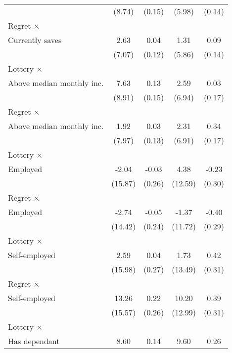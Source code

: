 \begin{table}[htbp]
\begin{tabular}{l*{4}{c}}
                &   (8.74)         &   (0.15)         &   (5.98)         &   (0.14)         \\
\addlinespace
Regret $\times$ \\ Currently saves&     2.63         &     0.04         &     1.31         &     0.09         \\
                &   (7.07)         &   (0.12)         &   (5.86)         &   (0.14)         \\
\addlinespace
Lottery $\times$ \\ Above median monthly inc.&     7.63         &     0.13         &     2.59         &     0.03         \\
                &   (8.91)         &   (0.15)         &   (6.94)         &   (0.17)         \\
\addlinespace
Regret $\times$ \\ Above median monthly inc.&     1.92         &     0.03         &     2.31         &     0.34\sym{**} \\
                &   (7.97)         &   (0.13)         &   (6.91)         &   (0.17)         \\
\addlinespace
Lottery $\times$ \\ Employed&    -2.04         &    -0.03         &     4.38         &    -0.23         \\
                &  (15.87)         &   (0.26)         &  (12.59)         &   (0.30)         \\
\addlinespace
Regret $\times$ \\ Employed&    -2.74         &    -0.05         &    -1.37         &    -0.40         \\
                &  (14.42)         &   (0.24)         &  (11.72)         &   (0.29)         \\
\addlinespace
Lottery $\times$ \\ Self-employed&     2.59         &     0.04         &     1.73         &     0.42         \\
                &  (15.98)         &   (0.27)         &  (13.49)         &   (0.31)         \\
\addlinespace
Regret $\times$ \\ Self-employed&    13.26         &     0.22         &    10.20         &     0.39         \\
                &  (15.57)         &   (0.26)         &  (12.99)         &   (0.31)         \\
\addlinespace
Lottery $\times$ \\ Has dependant&     8.60         &     0.14         &     9.60         &     0.26         \\

\end{tabular}
\end{table}
